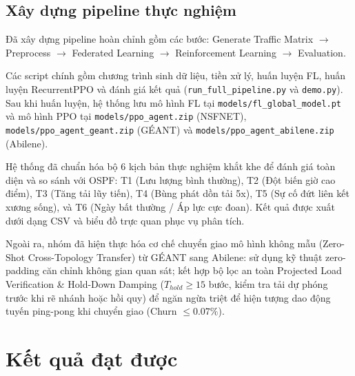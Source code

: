 \documentclass[11pt,a4paper]{article}
\begin{document}
\subsection{Xây dựng pipeline thực nghiệm}
Đã xây dựng pipeline hoàn chỉnh gồm các bước: Generate Traffic Matrix $\to$ Preprocess $\to$ Federated Learning $\to$ Reinforcement Learning $\to$ Evaluation.

Các script chính gồm chương trình sinh dữ liệu, tiền xử lý, huấn luyện FL, huấn luyện RecurrentPPO và đánh giá kết quả (\texttt{run\_full\_pipeline.py} và \texttt{demo.py}). Sau khi huấn luyện, hệ thống lưu mô hình FL tại \texttt{models/fl\_global\_model.pt} và mô hình PPO tại \texttt{models/ppo\_agent.zip} (NSFNET), \texttt{models/ppo\_agent\_geant.zip} (GÉANT) và \texttt{models/ppo\_agent\_abilene.zip} (Abilene).

Hệ thống đã chuẩn hóa bộ 6 kịch bản thực nghiệm khắt khe để đánh giá toàn diện và so sánh với OSPF: T1 (Lưu lượng bình thường), T2 (Đột biến giờ cao điểm), T3 (Tăng tải lũy tiến), T4 (Bùng phát dồn tải 5x), T5 (Sự cố đứt liên kết xương sống), và T6 (Ngày bất thường / Áp lực cực đoan). Kết quả được xuất dưới dạng CSV và biểu đồ trực quan phục vụ phân tích.

Ngoài ra, nhóm đã hiện thực hóa cơ chế chuyển giao mô hình không mẫu (Zero-Shot Cross-Topology Transfer) từ GÉANT sang Abilene: sử dụng kỹ thuật zero-padding căn chỉnh không gian quan sát; kết hợp bộ lọc an toàn Projected Load Verification \& Hold-Down Damping ($T_{hold} \ge 15$ bước, kiểm tra tải dự phóng trước khi rẽ nhánh hoặc hồi quy) để ngăn ngừa triệt để hiện tượng dao động tuyến ping-pong khi chuyển giao (Churn $\le 0.07\%$).

\section{Kết quả đạt được}
\end{document}
